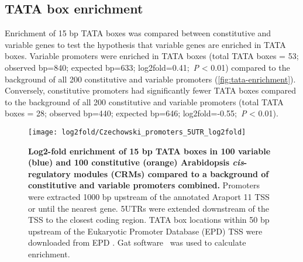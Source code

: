 \documentclass[../main.tex]{subfiles}
\begin{document}
\subsection{TATA box enrichment}

Enrichment of 15 bp TATA boxes was compared between constitutive and
variable genes to test the hypothesis that variable genes are enriched in TATA boxes.
Variable promoters were enriched in TATA boxes (total TATA boxes = 53; observed bp=840; expected bp=633; log2fold=0.41;~\textit{P} \textless{} 0.01) compared to the background of all 200 constitutive and variable promoters
(\autoref{fig:tata-enrichment}).
Conversely, constitutive promoters had significantly fewer TATA boxes compared to the background of all 200 constitutive and variable promoters (total TATA boxes = 28; observed bp=440; expected bp=646; log2fold=-0.55;~\textit{P} \textless{} 0.01).

\begin{figure}[!h]
	\begin{center}
		\capstart
		\texttt{[image: log2fold/Czechowski\_promoters\_5UTR\_log2fold]}
		\caption{
			\textbf{Log2\hyp{}fold enrichment of 15 bp TATA boxes in 100 variable (blue) and 100 constitutive (orange) Arabidopsis \textit{cis}\hyp{}regulatory modules (CRMs) compared to a background of constitutive and variable promoters combined.}
			Promoters were extracted 1000 bp upstream of the annotated Araport 11 \autocite{chengAraport11CompleteReannotation2017} TSS or until the nearest gene.
			5UTRs were extended downstream of the TSS to the closest coding region.
			TATA box locations within 50 bp upstream of the Eukaryotic Promoter Database (EPD) TSS were downloaded from EPD \autocite{dreosInfluenceRotationalNucleosome2016}.
			 Gat software~\autocite{hegerGATSimulationFramework2013} was used to calculate enrichment.
			\label{fig:tata-enrichment}
		}
	\end{center}
\end{figure}
\end{document}
